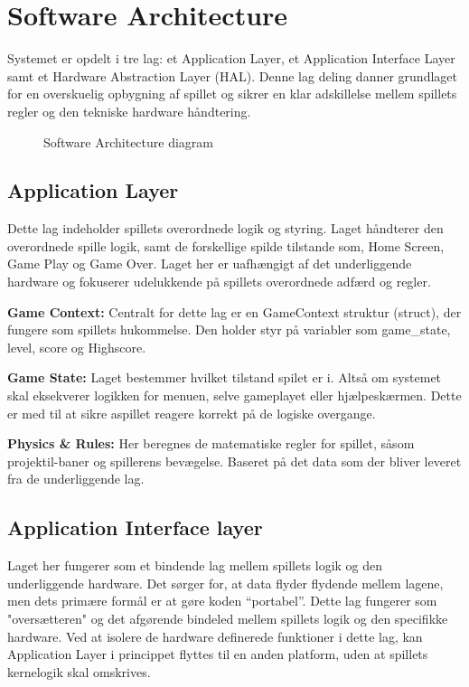 \vspace{15em}

\section{Software Architecture} \label{chap:ProduktUdvikling_sec:SoftwareArchitecture}
\vspace{0.5em}

Systemet er opdelt i tre lag: et Application Layer, et Application Interface Layer samt et Hardware Abstraction Layer (HAL). Denne lag deling danner grundlaget for en overskuelig opbygning af spillet og sikrer en klar adskillelse mellem spillets regler og den tekniske hardware håndtering.

\begin{figure}[h]
    \centering    
    
    \caption{Software Architecture diagram}
    \label{fig:Software_arkitektur}
    \vspace{0em}
\end{figure}

\subsection{Application Layer}
Dette lag indeholder spillets overordnede logik og styring. Laget håndterer den overordnede spille logik, samt de forskellige spilde tilstande som, Home Screen, Game Play og Game Over. Laget her er uafhængigt af det underliggende hardware og fokuserer udelukkende på spillets overordnede adfærd og regler.

\textbf{Game Context:} 
Centralt for dette lag er en GameContext struktur (struct), der fungere som spillets hukommelse. Den holder styr på variabler som game\_state, level, score og Highscore.

\textbf{Game State:}
Laget bestemmer hvilket tilstand spilet er i. Altså om systemet skal eksekverer logikken for menuen, selve gameplayet eller hjælpeskærmen. Dette er med til at sikre aspillet reagere korrekt på de logiske overgange.

\textbf{Physics \& Rules:} 
Her beregnes de matematiske regler for spillet, såsom projektil-baner og spillerens bevægelse. Baseret på det data som der bliver leveret fra de underliggende lag. 

\subsection{Application Interface layer}
Laget her fungerer som et bindende lag mellem spillets logik og den underliggende hardware. Det sørger for, at data flyder flydende mellem lagene, men dets primære formål er at gøre koden “portabel”. Dette lag fungerer som "oversætteren" og det afgørende bindeled mellem spillets logik og den specifikke hardware. Ved at isolere de hardware definerede funktioner i dette lag, kan Application Layer i princippet flyttes til en anden platform, uden at spillets kernelogik skal omskrives.

